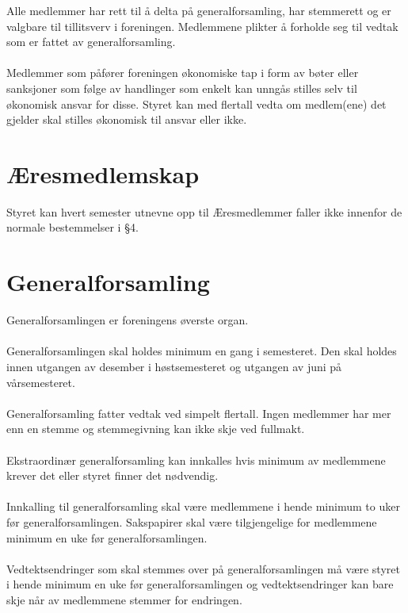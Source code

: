 \documentclass[12pt,a4paper,norsk]{article}
\begin{document}
Alle medlemmer har rett til å delta på generalforsamling, har stemmerett og er valgbare til tillitsverv i foreningen. Medlemmene plikter å forholde seg til vedtak som er fattet av generalforsamling.
\\
\\
Medlemmer som påfører foreningen økonomiske tap i form av bøter eller sanksjoner som følge av handlinger som enkelt kan unngås stilles selv til økonomisk ansvar for disse. Styret kan med  flertall vedta om medlem(ene) det gjelder skal stilles økonomisk til ansvar eller ikke.



\section{Æresmedlemskap}

Styret kan hvert semester utnevne opp til Æresmedlemmer faller ikke innenfor de normale bestemmelser i §4.



\section{Generalforsamling}

Generalforsamlingen er foreningens øverste organ.
\\
\\
Generalforsamlingen skal holdes minimum en gang i semesteret. Den skal holdes innen utgangen av desember i høstsemesteret og utgangen av juni på vårsemesteret.
\\
\\
Generalforsamling fatter vedtak ved simpelt flertall. Ingen medlemmer har mer enn en stemme og stemmegivning kan ikke skje ved fullmakt.
\\
\\
Ekstraordinær generalforsamling kan innkalles hvis minimum  av medlemmene krever det eller styret finner det nødvendig.
\\
\\
Innkalling til generalforsamling skal være medlemmene i hende minimum to uker før generalforsamlingen. Sakspapirer skal være tilgjengelige for medlemmene minimum en uke før generalforsamlingen.
\\
\\
Vedtektsendringer som skal stemmes over på generalforsamlingen må være styret i hende minimum en uke før generalforsamlingen og vedtektsendringer kan bare skje når  av medlemmene stemmer for endringen.
\end{document}
